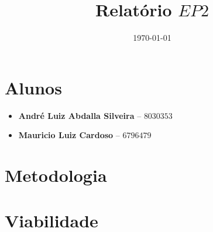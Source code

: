 \documentclass[11pt]{article}
\author{}
\date{\today}
\title{Relatório $EP2$}
\begin{document}
\maketitle

\section{Alunos}
\begin{itemize}
	\item \textbf{André Luiz Abdalla Silveira} -- $8030353$
	\item \textbf{Mauricio Luiz Cardoso} -- $6796479$
\end{itemize}

\section{Metodologia}

\section{Viabilidade}
\end{document}
